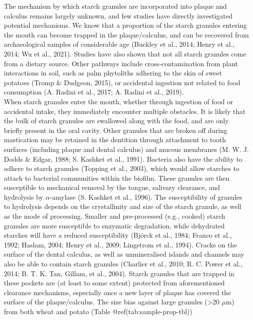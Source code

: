 \documentclass[
  letterpaper,
]{book}
\begin{document}
The mechanism by which starch granules are incorporated into plaque and
calculus remains largely unknown, and few studies have directly
investigated potential mechanisms. We know that a proportion of the
starch granules entering the mouth can become trapped in the
plaque/calculus, and can be recovered from archaeological samples of
considerable age (Buckley et al., 2014; Henry et al., 2014; Wu et al.,
2021). Studies have also shown that not all starch granules come from a
dietary source. Other pathways include cross-contamination from plant
interactions in soil, such as palm phytoliths adhering to the skin of
sweet potatoes (Tromp \& Dudgeon, 2015), or accidental ingestion not
related to food consumption (A. Radini et al., 2017; A. Radini et al.,
2019).\\
When starch granules enter the mouth, whether through ingestion of food
or accidental intake, they immediately encounter multiple obstacles. It
is likely that the bulk of starch granules are swallowed along with the
food, and are only briefly present in the oral cavity. Other granules
that are broken off during mastication may be retained in the dentition
through attachment to tooth surfaces (including plaque and dental
calculus) and mucous membranes (M. W. J. Dodds \& Edgar, 1988; S.
Kashket et al., 1991). Bacteria also have the ability to adhere to
starch granules (Topping et al., 2003), which would allow starches to
attach to bacterial communities within the biofilm. These granules are
then susceptible to mechanical removal by the tongue, salivary
clearance, and hydrolysis by \(\alpha\)-amylase (S. Kashket et al.,
1996). The susceptibility of granules to hydrolysis depends on the
crystallinity and size of the starch granule, as well as the mode of
processing. Smaller and pre-processed (e.g., cooked) starch granules are
more susceptible to enzymatic degradation, while dehydrated starches
will have a reduced susceptibility (Björck et al., 1984; Franco et al.,
1992; Haslam, 2004; Henry et al., 2009; Lingstrom et al., 1994). Cracks
on the surface of the dental calculus, as well as unmineralised islands
and channels may also be able to contain starch granules (Charlier et
al., 2010; R. C. Power et al., 2014; B. T. K. Tan, Gillam, et al.,
2004). Starch granules that are trapped in these pockets are (at least
to some extent) protected from aforementioned clearance mechanisms,
especially once a new layer of plaque has covered the surface of the
plaque/calculus. The size bias against large granules (\textgreater20
\(\mu\)m) from both wheat and potato (Table @ref(tab:sample-prop-tbl))
\end{document}
